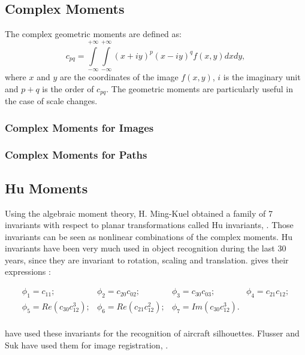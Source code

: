\subsection{Complex Moments}
\label{sec:ComplexMoments}
The complex geometric moments are defined as:
\begin {equation}
c_{pq} = \int\limits_{-\infty}^{+\infty}\int\limits_{-\infty}^{+\infty}(x + iy)^p(x- iy)^qf(x,y)dxdy,
\label{2.2}
\end{equation}
where $x$ and $y$ are the coordinates of the image $f(x,y)$, $i$ is the
imaginary unit and
$p+q$ is the order of $c_{pq}$. The geometric moments are
particularly useful in the case of scale changes.

\subsubsection{Complex Moments for Images}

\subsubsection{Complex Moments for Paths}


\subsection{Hu Moments}
\label{sec:HuMoments}
Using the algebraic moment theory, H. Ming-Kuel obtained a family of 7
invariants with respect to planar transformations called Hu invariants,
\cite{hu}. Those invariants can be seen as nonlinear combinations of
the complex moments. Hu invariants have
been very much used in object recognition during the last 30 years,
since they are invariant to rotation, scaling and translation. \cite{flusserinv} gives their expressions :

\begin{equation}
\begin{array}{cccc}
\phi_1 = c_{11};& \phi_2 = c_{20}c_{02};& \phi_3 = c_{30}c_{03};& \phi_4 = c_{21}c_{12};\\
\phi_5 = Re(c_{30}c_{12}^3);& \phi_6 = Re(c_{21}c_{12}^2);& \phi_7 = Im(c_{30}c_{12}^3).&\\
\end{array}
\end{equation}


\cite{dudani} have used these invariants for the recognition of
aircraft silhouettes. Flusser and Suk have used them for image
registration, \cite{flusser_2}.

